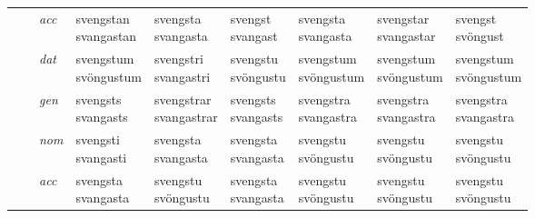 \begin{longtable}{l>{\footnotesize\itshape}l>{\footnotesize\itshape}lXXXXXX}
 & & acc &  \specialcell{svengstan\\ svangastan} & \specialcell{svengsta\\ svangasta} & \specialcell{svengst\\ svangast} & \specialcell{svengsta\\ svangasta} & \specialcell{svengstar\\ svangastar} & \specialcell{svengst\\ svöngust} \\*
 & & dat & \specialcell{svengstum\\ svöngustum} & \specialcell{svengstri\\ svangastri} & \specialcell{svengstu\\ svöngustu} & \specialcell{svengstum\\ svöngustum} & \specialcell{svengstum\\ svöngustum} & \specialcell{svengstum\\ svöngustum} \\*
 & & gen & \specialcell{svengsts\\ svangasts} & \specialcell{svengstrar\\ svangastrar} & \specialcell{svengsts\\ svangasts} & \specialcell{svengstra\\ svangastra} & \specialcell{svengstra\\ svangastra} & \specialcell{svengstra\\ svangastra} \\
\cmidrule(r){2-9}
 &  \multirow{4}{*}{\begin{turn}{90}\textit{sup w}\end{turn}} & nom & \specialcell{svengsti\\ svangasti} & \specialcell{svengsta\\ svangasta} & \specialcell{svengsta\\ svangasta} & \specialcell{svengstu\\ svöngustu} & \specialcell{svengstu\\ svöngustu} & \specialcell{svengstu\\ svöngustu} \\*
 & & acc & \specialcell{svengsta\\ svangasta} & \specialcell{svengstu\\ svöngustu} & \specialcell{svengsta\\ svangasta} & \specialcell{svengstu\\ svöngustu} & \specialcell{svengstu\\ svöngustu} & \specialcell{svengstu\\ svöngustu} \\*

\end{longtable}
